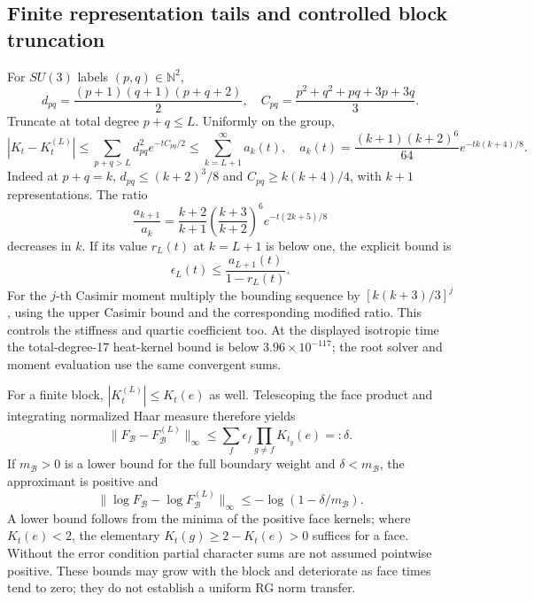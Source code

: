 \documentclass[12pt,a4paper]{article}
\begin{document}
\subsection{Finite representation tails and controlled block truncation}
\label{p10:app:v199-heat-tails}
For \(SU(3)\) labels \((p,q)\in\mathbb N^2\),
\[
 d_{pq}=\frac{(p+1)(q+1)(p+q+2)}2,\quad
 C_{pq}=\frac{p^2+q^2+pq+3p+3q}{3}.
\]
Truncate at total degree \(p+q\le L\).  Uniformly on the group,
\[
 |K_t-K_t^{(L)}|\le\sum_{p+q>L}d_{pq}^2e^{-tC_{pq}/2}
 \le\sum_{k=L+1}^\infty a_k(t),\quad
 a_k(t)=\frac{(k+1)(k+2)^6}{64}e^{-tk(k+4)/8}.
\]
Indeed at \(p+q=k\), \(d_{pq}\le(k+2)^3/8\) and
\(C_{pq}\ge k(k+4)/4\), with \(k+1\) representations.  The ratio
\[
 \frac{a_{k+1}}{a_k}=\frac{k+2}{k+1}
 \left(\frac{k+3}{k+2}\right)^6e^{-t(2k+5)/8}
\]
decreases in \(k\).  If its value \(r_L(t)\) at \(k=L+1\) is below one,
the explicit bound is
\begin{equation}
 \epsilon_L(t)\le\frac{a_{L+1}(t)}{1-r_L(t)}.
 \label{p10:eq:v199-representation-tail}
\end{equation}
For the \(j\)-th Casimir moment multiply the bounding sequence by
\([k(k+3)/3]^j\), using the upper Casimir bound and the corresponding
modified ratio.  This controls the stiffness and quartic coefficient too.
At the displayed isotropic time the total-degree-17 heat-kernel bound is
below \(3.96\times10^{-117}\); the root solver and moment evaluation use
the same convergent sums.

For a finite block, \(|K_t^{(L)}|\le K_t(e)\) as well.  Telescoping the
face product and integrating normalized Haar measure therefore yields
\begin{equation}
 \|F_{\mathcal B}-F_{\mathcal B}^{(L)}\|_\infty
 \le\sum_f\epsilon_f\prod_{g\ne f}K_{t_g}(e)=:\delta.
 \label{p10:eq:v199-block-error}
\end{equation}
If \(m_{\mathcal B}>0\) is a lower bound for the full boundary weight and
\(\delta<m_{\mathcal B}\), the approximant is positive and
\[
 \|\log F_{\mathcal B}-\log F_{\mathcal B}^{(L)}\|_\infty
 \le-\log(1-\delta/m_{\mathcal B}).
\]
A lower bound follows from the minima of the positive face kernels; where
\(K_t(e)<2\), the elementary \(K_t(g)\ge2-K_t(e)>0\) suffices for a
face.  Without the error condition partial character sums are not assumed
pointwise positive.  These bounds may grow with the block and deteriorate
as face times tend to zero; they do not establish a uniform RG norm transfer.

\end{document}
